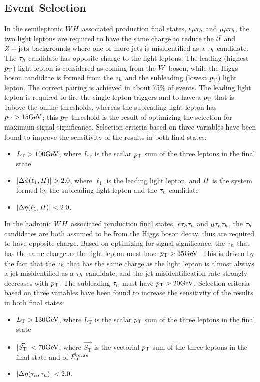 


\subsection{Event Selection}
\label{sec:vh_evt_selection}
In the semileptonic $WH$ associated production final states, $e\mu\tau_{h}$ and 
$\mu\mu\tau_{h}$,
the two light leptons are required to have the same charge to reduce the $t\bar{t}$ 
and $Z+\textrm{jets}$ backgrounds where one or more jets is misidentified as a $\tau_{h}$ 
candidate. The $\tau_{h}$ candidate has opposite charge to the light leptons. The leading (highest $p_\mathrm{T}$)
light lepton is considered as coming from the $W$ boson, while the Higgs boson 
candidate is formed from the $\tau_{h}$ and the subleading (lowest $p_\mathrm{T}$) light lepton. The 
correct pairing is achieved in about 75\% of events. The leading light lepton is required 
to fire the single lepton triggers and to have a $p_\mathrm{T}$ that is 1\GeV above the online 
thresholds, whereas the subleading light lepton has $p_\mathrm{T}>15\mathrm{GeV}$; this $p_\mathrm{T}$ threshold
is the result of optimizing the selection for maximum signal significance. 
Selection criteria based on three variables have been found to 
improve the sensitivity of the results in both final states:
\begin{itemize}
\item $L_{\text{T}}>100\mathrm{GeV}$, where $L_{\text{T}}$ is the scalar $p_\mathrm{T}$ sum of the three leptons in the final state
\item $\lvert\Delta\phi(\ell_1,H)\rvert>2.0$, where $\ell_1$ is the leading light lepton, and 
$H$ is the system formed by the subleading light lepton and the $\tau_{h}$ candidate
\item $\lvert\Delta\eta(\ell_1,H)\rvert<2.0$.
\end{itemize}


In the hadronic $WH$ associated production final states, $e\tau_{h}\tau_{h}$ and 
$\mu\tau_{h}\tau_{h}$,
the $\tau_{h}$ candidates are both assumed to be from the Higgs boson decay, thus are 
required to have opposite charge. Based on optimizing for signal significance,
the $\tau_{h}$ that has the same charge as the light lepton must 
have $p_\mathrm{T} > 35\mathrm{GeV}$. This is driven 
by the fact that the $\tau_{h}$ that has the same charge as the light lepton is almost 
always a jet misidentified as a $\tau_{h}$ candidate, and the jet misidentification 
rate strongly decreases with $p_\mathrm{T}$. 
The subleading $\tau_{h}$ must have $p_\mathrm{T} > 20\mathrm{GeV}$. 
Selection criteria based on three variables 
have been found to increase the sensitivity of the results in both final states:
\begin{itemize}
\item $L_{\text{T}}>130\mathrm{GeV}$, where $L_{\text{T}}$ is the scalar $p_\mathrm{T}$ sum of the three leptons in the final state
\item $\lvert\vec{S_{\text{T}}}\rvert<70\mathrm{GeV}$, where $\vec{S_{\text{T}}}$ is the vectorial $p_\mathrm{T}$ sum of the three leptons in the final state and of $\vec{E}^{miss}_T$
\item $\lvert\Delta\eta(\tau_{h},\tau_{h})\rvert<2.0$.
\end{itemize}



